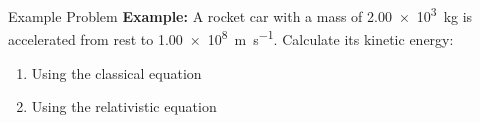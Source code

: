 \documentclass[12pt,compress,aspectratio=169]{beamer}
\begin{document}
\begin{frame}{Example Problem}
  \textbf{Example:} A rocket car with a mass of \SI{2.00e3}{\kilo\gram} is
  accelerated from rest to \SI{1.00e8}{\metre\per\second}. Calculate its
  kinetic energy:
  \begin{enumerate}
  \item Using the classical equation
  \item Using the relativistic equation
  \end{enumerate}
\end{frame}
\end{document}
